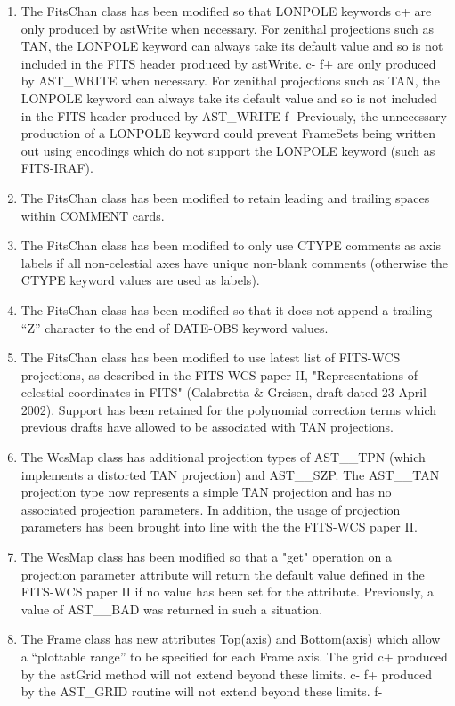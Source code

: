 \documentclass[twoside,11pt]{article}
\begin{document}
\begin{enumerate}

\item The FitsChan class has been modified so that LONPOLE keywords
c+
are only produced by astWrite when necessary. For zenithal projections such as 
TAN, the LONPOLE keyword can always take its default value and so is
not included in the FITS header produced by astWrite.
c-
f+
are only produced by AST\_WRITE when necessary. For zenithal projections such as 
TAN, the LONPOLE keyword can always take its default value and so is
not included in the FITS header produced by AST\_WRITE
f-
Previously, the unnecessary production of a LONPOLE keyword could prevent
FrameSets being written out using encodings which do not support the
LONPOLE keyword (such as FITS-IRAF).

\item The FitsChan class has been modified to retain leading and trailing
spaces within COMMENT cards.

\item The FitsChan class has been modified to only use CTYPE comments as 
axis labels if all non-celestial axes have unique non-blank comments
(otherwise the CTYPE keyword values are used as labels).

\item The FitsChan class has been modified so that it does not append a
trailing ``Z'' character to the end of DATE-OBS keyword values.

\item The FitsChan class has been modified to use latest list of FITS-WCS 
projections, as described in the FITS-WCS paper II, "Representations of
celestial coordinates in FITS" (Calabretta \& Greisen, draft dated 23
April 2002). Support has been retained for the polynomial correction
terms which previous drafts have allowed to be associated with TAN
projections. 

\item The WcsMap class has additional projection types of AST\_\_TPN
(which implements a distorted TAN projection) and AST\_\_SZP. The AST\_\_TAN
projection type now represents a simple TAN projection and has no 
associated projection parameters. In addition, the usage of projection 
parameters has been brought into line with the the FITS-WCS paper II. 

\item The WcsMap class has been modified so that a "get" operation on a
projection parameter attribute will return the default value defined in the
FITS-WCS paper II if no value has been set for the attribute. Previously, a
value of AST\_\_BAD was returned in such a situation.

\item The Frame class has new attributes Top(axis) and Bottom(axis) which
allow a ``plottable range'' to be specified for each Frame axis. The grid
c+
produced by the astGrid method will not extend beyond these limits.
c-
f+
produced by the AST\_GRID routine will not extend beyond these limits.
f-

\end{enumerate}
\end{document}
